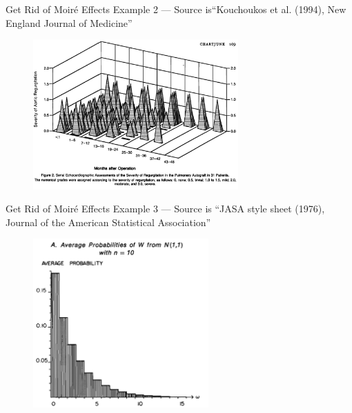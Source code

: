 \documentclass[notes, aspectratio=1610]{beamer}
\begin{document}
\begin{frame}
	{Get Rid of Moir\'e Effects}
	{Example 2 --- Source is``Kouchoukos et al. (1994), New England Journal of Medicine''}
	\centering
	\begin{figure}
	\includegraphics[width=0.7\textwidth]{images/moire_effect_2.png}
	\end{figure}
\end{frame}

\begin{frame}
	{Get Rid of Moir\'e Effects}
	{Example 3 --- Source is ``JASA style sheet (1976), Journal of the American Statistical Association''}
	\centering
	\begin{figure}
	\includegraphics[width=0.6\textwidth]{images/moire_effect_3.png}
	\end{figure}
\end{frame}
\end{document}
